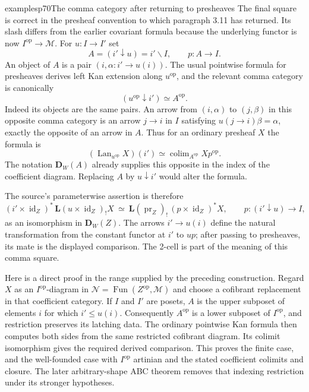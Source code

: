 \begin{dcomment}{examples}{p70}{The comma category after returning to presheaves}
The final square is correct in the presheaf convention to which paragraph 3.11 has returned. Its slash differs from the earlier covariant formula because the underlying functor is now $I^{\mathrm{op}}\to\mathcal M$. For $u:I\to I'$ set
\[
 A=(i'\downarrow u)=i'\backslash I,
 \qquad p:A\longrightarrow I.
\]
An object of $A$ is a pair $(i,\alpha:i'\to u(i))$. The usual pointwise formula for presheaves derives left Kan extension along $u^{\mathrm{op}}$, and the relevant comma category is canonically
\[
 (u^{\mathrm{op}}\downarrow i')\simeq A^{\mathrm{op}}.
\]
Indeed its objects are the same pairs. An arrow from $(i,\alpha)$ to $(j,\beta)$ in this opposite comma category is an arrow $j\to i$ in $I$ satisfying $u(j\to i)\beta=\alpha$, exactly the opposite of an arrow in $A$. Thus for an ordinary presheaf $X$ the formula is
\[
 (\operatorname{Lan}_{u^{\mathrm{op}}}X)(i')
 \simeq \operatorname{colim}_{A^{\mathrm{op}}}X p^{\mathrm{op}}.
\]
The notation $\mathbf D_W(A)$ already supplies this opposite in the index of the coefficient diagram. Replacing $A$ by $u\downarrow i'$ would alter the formula.

The source's parameterwise assertion is therefore
\[
 (i'\times\operatorname{id}_Z)^*\,
       \mathbf L(u\times\operatorname{id}_Z)_!X
 \ \simeq\
 \mathbf L(\operatorname{pr}_Z)_!\,
       (p\times\operatorname{id}_Z)^*X,
 \qquad p:(i'\downarrow u)\longrightarrow I,
\]
as an isomorphism in $\mathbf D_W(Z)$. The arrows $i'\to u(i)$ define the natural transformation from the constant functor at $i'$ to $up$; after passing to presheaves, its mate is the displayed comparison. The 2-cell is part of the meaning of this comma square.

Here is a direct proof in the range supplied by the preceding construction. Regard $X$ as an $I^{\mathrm{op}}$-diagram in $\mathcal N=\operatorname{Fun}(Z^{\mathrm{op}},\mathcal M)$ and choose a cofibrant replacement in that coefficient category. If $I$ and $I'$ are posets, $A$ is the upper subposet of elements $i$ for which $i'\leq u(i)$. Consequently $A^{\mathrm{op}}$ is a lower subposet of $I^{\mathrm{op}}$, and restriction preserves its latching data. The ordinary pointwise Kan formula then computes both sides from the same restricted cofibrant diagram. Its colimit isomorphism gives the required derived comparison. This proves the finite case, and the well-founded case with $I^{\mathrm{op}}$ artinian and the stated coefficient colimits and closure. The later arbitrary-shape ABC theorem removes that indexing restriction under its stronger hypotheses.


\end{dcomment}
